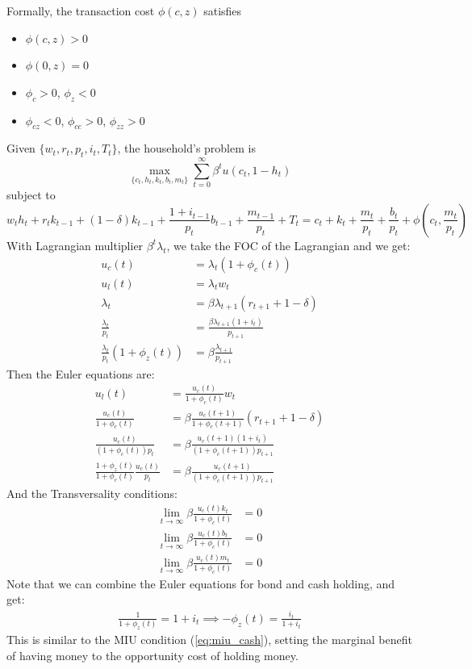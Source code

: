 \documentclass[12pt]{article}
\begin{document}
Formally, the transaction cost $\phi(c,z)$ satisfies
\begin{itemize}
	\item $\phi(c,z)>0$
	\item $\phi(0, z) = 0$
	\item $\phi_c >0$, $\phi_z<0$
	\item $\phi_{cz} <0$, $\phi_{cc}>0$, $\phi_{zz} >0$
\end{itemize}
Given $\{w_t, r_t, p_t, i_t, T_t\}$, the household's problem is
\begin{equation}
	\max_{\{c_t, h_t, k_t, b_t, m_t\}} \sum_{t=0}^\infty \beta^t u(c_t, 1-h_t)
\end{equation}
subject to
\begin{equation}
	w_th_t + r_t k_{t-1} + (1-\delta)k_{t-1} + \frac{1+i_{t-1}}{p_t}b_{t-1} + \frac{m_{t-1}}{p_t} + T_t = c_t + k_t + \frac{m_t}{p_t} + \frac{b_t}{p_t} + \phi(c_t, \frac{m_t}{p_t})
\end{equation}
With Lagrangian multiplier $\beta^t \lambda_t$, we take the FOC of the Lagrangian and we get:
\begin{align}
	u_c(t) &= \lambda_t(1+\phi_c(t))\\
	u_l(t) &= \lambda_t w_t\\
	\lambda_t &= \beta \lambda_{t+1}(r_{t+1} + 1 - \delta)\\
	\frac{\lambda_t}{p_t} &= \frac{\beta \lambda_{t+1}(1 + i_t)}{p_{t+1}}\\
	\frac{\lambda_t}{p_t}(1 + \phi_z (t)) &= \beta \frac{\lambda_{t+1}}{p_{t+1}}
\end{align}
Then the Euler equations are:
\begin{align}
	u_l(t) &= \frac{u_c(t)}{1 + \phi_c (t)}w_t\\
	\frac{u_c(t)}{1 + \phi_c (t)} &= \beta \frac{u_c(t+1)}{1 + \phi_c (t+1)}(r_{t+1} + 1 - \delta)\\
	\frac{u_c(t)}{(1 + \phi_c (t))p_t} &= \beta\frac{u_c(t+1)(1+i_{t})}{(1 + \phi_c (t+1))p_{t+1}}\\
	\frac{1 + \phi_z(t)}{1 + \phi_c(t)}\frac{u_c(t)}{p_t} &= \beta \frac{u_c(t+1)}{(1+\phi_c(t+1))p_{t+1}}
\end{align}
And the Transversality conditions:
\begin{align}
	\lim_{t\rightarrow \infty}\beta \frac{u_c(t)k_t}{1+\phi_c(t)} &= 0\\
	\lim_{t\rightarrow \infty}\beta \frac{u_c(t)b_t}{1+\phi_c(t)} &= 0\\
	\lim_{t\rightarrow \infty}\beta \frac{u_c(t)m_t}{1+\phi_c(t)} &= 0
\end{align}
Note that we can combine the Euler equations for bond and cash holding, and get:
\begin{align}
	\frac{1}{1 + \phi_z(t)} = 1 + i_t \implies 	-\phi_z(t) = \frac{i_t}{1 + i_t}
\end{align}
This is similar to the MIU condition (\ref{eq:miu_cash}), setting the marginal benefit of having money to the opportunity cost of holding money.
\end{document}
